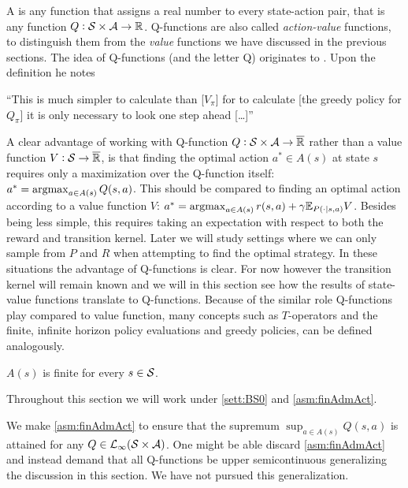 A  is any function that assigns a real number
to every state-action pair, that is any function $Q : \mathcal{S} \times \mathcal{A}
\to \mathbb{R}$. Q-functions are also called \emph{action-value} functions,
to distinguish them from the \emph{value} functions we have discussed in the
previous sections.
The idea of Q-functions (and the letter Q) originates to
. Upon the definition he notes
\begin{displayquote}
  ``This is much simpler to calculate than [$V_\pi$]
  for to calculate [the greedy policy for $Q_\pi$] it is only necessary to look one
  step ahead [\ldots]''
\end{displayquote}
A clear advantage of working with Q-function
$Q:\mathcal{S}\times\mathcal{A} \to \overline{\mathbb{R}}$ rather than a value function
$V:\mathcal{S}\to \overline{\mathbb{R}}$,
is that finding the optimal action $a^* \in A(s)$ at state $s$
requires only a maximization over the Q-function itself:
$a^* = \operatorname*{argmax}_{a \in A(s)} Q(s,a)$.
This should be compared to finding an optimal action
according to a value function $V$:
$a^* = \operatorname*{argmax}_{a \in A(s)} r(s,a) + \gamma \mathbb{E}_{P(\cdot \mid s,a)} V$.
Besides being less simple,
this requires taking an expectation with respect to 
both the reward and transition kernel.
Later we will study settings where we can only sample from $P$ and $R$
when attempting to find the optimal strategy.
In these situations the advantage of Q-functions is clear.
For now however the transition kernel will remain known and we
will in this section see how the results of state-value functions
translate to Q-functions.
Because of the similar role Q-functions play compared to value function,
many concepts such as $T$-operators and the finite, infinite horizon
policy evaluations and greedy policies, can be defined analogously.

\begin{asm}
  $A(s)$ is finite for every $s \in \mathcal{S}$. 
  \label{asm:finAdmAct}
\end{asm}
Throughout this section we will work under
\cref{sett:BS0} and \cref{asm:finAdmAct}.

\begin{rem}
  We make \cref{asm:finAdmAct} to ensure that the supremum
  $\sup_{a \in A(s)} Q(s, a)$ is attained for any
  $Q \in \mathcal{L}_\infty(\mathcal{S} \times \mathcal{A})$.
  One might be able discard \cref{asm:finAdmAct} and instead
  demand that all Q-functions be
  upper semicontinuous generalizing the discussion in this section.
  We have not pursued this generalization.
\end{rem}

